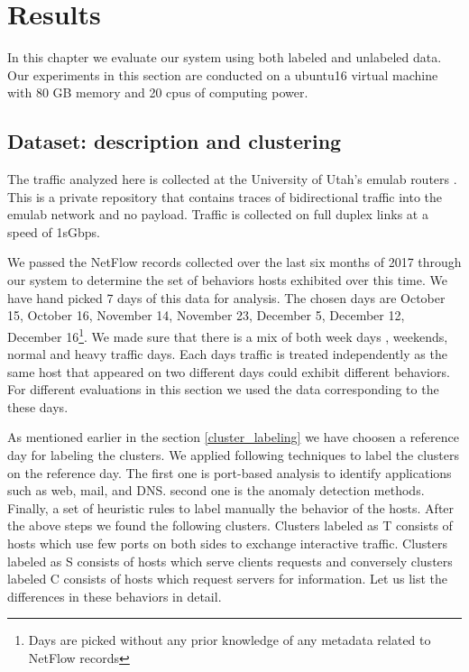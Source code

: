 
\chapter{Results}

In this chapter we evaluate our system using both labeled and unlabeled data. Our experiments in this section are conducted on a ubuntu16 virtual machine with 80 GB memory and 20 cpus of computing power. 

\section{Dataset: description and clustering}
The traffic analyzed here is collected at the University of Utah's emulab routers \cite{White+:osdi02}. This is a private repository that contains traces of bidirectional traffic into the emulab network and no payload. Traffic is collected on full duplex links at a speed of 1sGbps.

We passed the NetFlow records collected over the last six months of 2017 through our system to determine the set of behaviors hosts exhibited over this time. We have hand picked 7 days of this data for analysis. The chosen days are October 15, October 16, November 14, November 23, December 5, December 12, December 16\footnote{Days are picked without any prior knowledge of any metadata related to NetFlow records}. We made sure that there is a mix of both week days , weekends, normal and heavy traffic days. Each days traffic is treated independently as the same host that appeared on two different days could exhibit different behaviors. For different evaluations in this section we used the data corresponding to the these days.

As mentioned earlier in the section \ref{cluster_labeling} we have choosen a reference day for labeling the clusters. We applied following techniques to label the clusters on the reference day. The first one is port-based analysis to identify applications such as web, mail, and DNS. second one is the anomaly detection methods. Finally, a set of heuristic rules to label manually the behavior of the hosts. After the above steps we found the following clusters. Clusters labeled as T consists of hosts which use few ports on both sides to exchange interactive traffic. Clusters labeled as S consists of hosts which serve clients requests and conversely clusters labeled C consists of hosts which request servers for information. Let us list the differences in these behaviors in detail.

